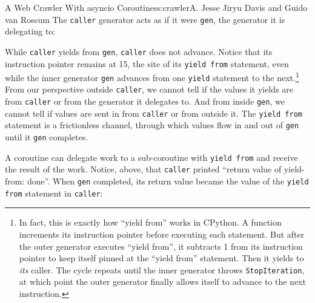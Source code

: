 \begin{aosachapter}{A Web Crawler With asyncio Coroutines}{s:crawler}{A. Jesse Jiryu Davis and Guido van Rossum}
The \texttt{caller} generator acts as if it were \texttt{gen}, the
generator it is delegating to:

\begin{Shaded}
\begin{Highlighting}[]
\NormalTok{)}
\NormalTok{)}
\NormalTok{)}
 \NormalTok{-}
\end{Highlighting}
\end{Shaded}

While \texttt{caller} yields from \texttt{gen}, \texttt{caller} does not
advance. Notice that its instruction pointer remains at 15, the site of
its \texttt{yield from} statement, even while the inner generator
\texttt{gen} advances from one \texttt{yield} statement to the
next.\footnote{In fact, this is exactly how ``yield from'' works in
  CPython. A function increments its instruction pointer before
  executing each statement. But after the outer generator executes
  ``yield from'', it subtracts 1 from its instruction pointer to keep
  itself pinned at the ``yield from'' statement. Then it yields to
  \emph{its} caller. The cycle repeats until the inner generator throws
  \texttt{StopIteration}, at which point the outer generator finally
  allows itself to advance to the next instruction.} From our
perspective outside \texttt{caller}, we cannot tell if the values it
yields are from \texttt{caller} or from the generator it delegates to.
And from inside \texttt{gen}, we cannot tell if values are sent in from
\texttt{caller} or from outside it. The \texttt{yield from} statement is
a frictionless channel, through which values flow in and out of
\texttt{gen} until it \texttt{gen} completes.

A coroutine can delegate work to a sub-coroutine with
\texttt{yield from} and receive the result of the work. Notice, above,
that \texttt{caller} printed ``return value of yield-from: done''. When
\texttt{gen} completed, its return value became the value of the
\texttt{yield from} statement in \texttt{caller}:


\end{aosachapter}
